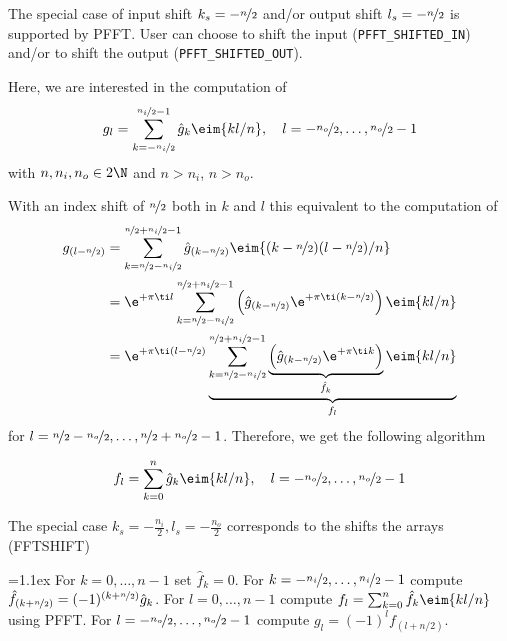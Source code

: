 The special case of input shift $k_s=-\nicefrac n2$ and/or output shift $l_s=-\nicefrac n2$ is supported by PFFT.
User can choose to shift the input (\verb+PFFT_SHIFTED_IN+) and/or to shift the output (\verb+PFFT_SHIFTED_OUT+).

Here, we are interested in the computation of
\begin{equation*}
  g_l = \sum_{k=-\nicefrac{n_i}{2}}^{\nicefrac{n_i}{2}-1} \hat g_k \eim{kl/n}, \quad l=-\nicefrac{n_o}{2},\hdots,\nicefrac{n_o}{2}-1  
\end{equation*}
with $n, n_i, n_o \in 2\N$ and $n>n_i$, $n>n_o$.

With an index shift of $\nicefrac n2$ both in $k$ and $l$ this equivalent to the computation of
\begin{align*}
  g_{(l-\nicefrac{n}{2})}
  &= \sum_{k=\nicefrac{n}{2}-\nicefrac{n_i}{2}}^{\nicefrac{n}{2}+\nicefrac{n_i}{2}-1}
     \hat g_{(k-\nicefrac{n}{2})} \eim{(k-\nicefrac n2)(l-\nicefrac n2)/n} \\
  &= \e^{+\pi\ti l} 
       \sum_{k=\nicefrac{n}{2}-\nicefrac{n_i}{2}}^{\nicefrac{n}{2}+\nicefrac{n_i}{2}-1}
       \left(\hat g_{(k-\nicefrac{n}{2})}\e^{+\pi\ti (k-\nicefrac n2)}\right) \eim{kl/n} \\
  &= \e^{+\pi\ti(l-\nicefrac n2)} 
     \underbrace{
       \sum_{k=\nicefrac{n}{2}-\nicefrac{n_i}{2}}^{\nicefrac{n}{2}+\nicefrac{n_i}{2}-1}
       \underbrace{\left(\hat g_{(k-\nicefrac{n}{2})}\e^{+\pi\ti k}\right)}_{\hat f_k} \eim{kl/n}
     }_{f_l}
\end{align*}
for $ l=\nicefrac n2-\nicefrac{n_o}{2},\hdots,\nicefrac n2 +\nicefrac{n_o}{2}-1$.
Therefore, we get the following algorithm

\begin{equation*}
  f_l = \sum_{k=0}^n \hat g_k \eim{kl/n}, \quad l=-\nicefrac{n_o}{2},\hdots,\nicefrac{n_o}{2}-1  
\end{equation*}

The special case $k_s=-\frac{n_i}{2}, l_s=-\frac{n_o}{2}$ corresponds to the shifts the arrays (\textsf{FFTSHIFT})
\begin{algorithm}
  \begin{algorithmic}[1]
    \itemsep=1.1ex
    \State For $k=0,\hdots,n-1$ set $\hat f_k = 0$.
    \State For $k=-\nicefrac{n_i}{2},\hdots,\nicefrac{n_i}{2}-1$ compute $\hat f_{(k+\nicefrac{n}{2})} = (-1)^{(k+\nicefrac{n}{2})} \hat g_{k}$.
    \State For $l=0,\hdots,n-1$ compute $f_l = \sum_{k=0}^{n} \hat f_k \eim{kl/n}$ using PFFT.
    \State For $l=-\nicefrac{n_o}{2},\hdots,\nicefrac{n_o}{2}-1$ compute $g_l = (-1)^l f_{(l+n/2)} $.
  \end{algorithmic}
\end{algorithm}


